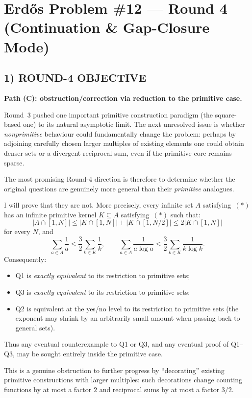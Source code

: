 \section{Erd\H{o}s Problem \#12 --- Round 4 (Continuation \& Gap-Closure Mode)}

\subsection*{1) ROUND-4 OBJECTIVE}

\textbf{Path (C): obstruction/correction via reduction to the primitive case.}

Round~3 pushed one important primitive construction paradigm (the square-based one) to its natural asymptotic limit. The next unresolved issue is whether \emph{nonprimitive} behaviour could fundamentally change the problem: perhaps by adjoining carefully chosen larger multiples of existing elements one could obtain denser sets or a divergent reciprocal sum, even if the primitive core remains sparse.

The most promising Round-4 direction is therefore to determine whether the original questions are genuinely more general than their \emph{primitive} analogues.

I will prove that they are not. More precisely, every infinite set $A$ satisfying~$(*)$ has an infinite primitive kernel $K\subseteq A$ satisfying~$(*)$ such that:
\[
|A\cap[1,N]|\le |K\cap[1,N]|+|K\cap[1,N/2]|\le 2|K\cap[1,N]|
\]
for every $N$, and
\[
\sum_{a\in A}\frac1a\le \frac32\sum_{k\in K}\frac1k,
\qquad
\sum_{a\in A}\frac1{a\log a}\le \frac32\sum_{k\in K}\frac1{k\log k}.
\]
Consequently:
\begin{itemize}
\item Q1 is \emph{exactly equivalent} to its restriction to primitive sets;
\item Q3 is \emph{exactly equivalent} to its restriction to primitive sets;
\item Q2 is equivalent at the yes/no level to its restriction to primitive sets (the exponent may shrink by an arbitrarily small amount when passing back to general sets).
\end{itemize}
Thus any eventual counterexample to Q1 or Q3, and any eventual proof of Q1--Q3, may be sought entirely inside the primitive case.

This is a genuine obstruction to further progress by ``decorating'' existing primitive constructions with larger multiples: such decorations change counting functions by at most a factor $2$ and reciprocal sums by at most a factor $3/2$.

